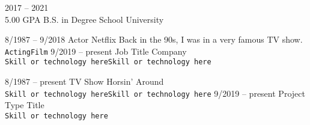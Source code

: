 \documentclass[9pt]{developercv} %
\begin{document}
\vspace{0.5cm}



\begin{entrylist}

	\entry
		{2017 -- 2021\\
		\small{5.00 GPA}}
		{B.S. in Degree}
		{School University}
		{\lorem\lorem\lorem}
\end{entrylist}



\begin{entrylist}
	\entry
		{8/1987 -- 9/2018}
		{Actor}
		{Netflix}
		{Back in the 90s, I was in a very famous TV show. \lorem\lorem\\
		\texttt{Acting}\slashsep\texttt{Film}}
	\entry
		{9/2019 -- present}
		{Job Title}
		{Company}
		{\lorem\lorem\lorem\\
		\texttt{Skill or technology here}\slashsep\texttt{Skill or technology here}}
\end{entrylist}



\begin{entrylist}
	\entry
		{8/1987 -- present}
		{TV Show}
		{Horsin' Around}
		{\lorem\lorem\lorem\\
		\texttt{Skill or technology here}\slashsep\texttt{Skill or technology here}}
	\entry
		{9/2019 -- present}
		{Project Type}
		{Title}
		{\lorem\lorem\lorem
		\\ \texttt{Skill or technology here}}
\end{entrylist}
\end{document}

